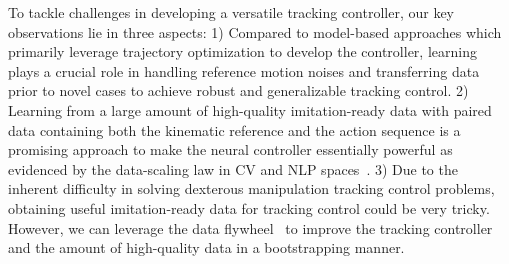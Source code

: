 

To tackle challenges in developing a versatile tracking controller, our key observations lie in three aspects: 1) Compared to model-based approaches which primarily leverage trajectory optimization to develop the controller, learning plays a crucial role in handling reference motion noises and transferring data prior to novel cases to achieve robust and generalizable tracking control. 2) Learning from a large amount of high-quality imitation-ready data with paired data containing both the kinematic reference and the action sequence is a promising approach to make the neural controller essentially powerful as evidenced by the data-scaling law in CV and NLP spaces~\citep{Achiam2023GPT4TR,Brown2020LanguageMA}. 3) Due to the inherent difficulty in solving dexterous manipulation tracking control problems, obtaining useful imitation-ready data for tracking control could be very tricky. However, we can leverage the data flywheel~\citep{Chiang2024ChatbotAA,Bai2023QwenTR,Ouyang2022TrainingLM} to improve the tracking controller and the amount of high-quality data in a bootstrapping manner. 




